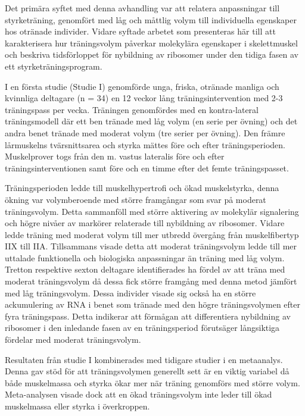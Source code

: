\documentclass[twoside,10pt]{gihclass} %
\begin{document}
Det primära syftet med denna avhandling var att relatera anpassningar till styrketräning, genomfört med låg och måttlig volym till individuella egenskaper hos otränade individer.
Vidare syftade arbetet som presenteras här till att karakterisera hur träningsvolym påverkar molekylära
egenskaper i skelettmuskel och beskriva tidsförloppet för nybildning av ribosomer under den tidiga fasen av ett styrketräningsprogram.

I en första studie (Studie I) genomförde unga, friska, otränade manliga och kvinnliga deltagare (n = 34) en 12 veckor lång träningsintervention med 2-3 träningspass per vecka. Träningen genomfördes med en kontra-lateral träningsmodell där ett ben tränade med låg volym (en serie per övning) och det andra benet tränade med moderat volym (tre serier per övning).
Den främre lårmuskelns tvärsnittsarea och styrka mättes före och efter träningsperioden.
Muskelprover togs från den m. vastus lateralis före och efter träningsinterventionen samt före och en timme efter det femte träningspasset.

Träningsperioden ledde till muskelhypertrofi och ökad muskelstyrka, denna ökning var volymberoende med större framgångar som svar på moderat träningsvolym. Detta sammanföll med större aktivering av molekylär signalering och högre nivåer av markörer relaterade till nybildning av ribosomer. Vidare ledde träning med moderat volym till mer utbredd övergång från muskelfibertyp IIX till IIA. Tillsammans visade detta att moderat träningsvolym ledde till mer uttalade funktionella och biologiska anpassningar än träning med låg volym.
Tretton respektive sexton deltagare identifierades ha fördel av att träna med moderat träningsvolym då dessa fick större framgång med denna metod jämfört med låg träningsvolym. Dessa individer visade sig också ha en större ackumulering av RNA i benet som tränade med den högre träningsvolymen efter fyra träningspass. Detta indikerar att förmågan att differentiera nybildning av ribosomer i den inledande fasen av en träningsperiod förutsäger långsiktiga fördelar med moderat träningsvolym.

Resultaten från studie I kombinerades med tidigare studier i en metaanalys. Denna gav stöd för att träningsvolymen generellt sett är en viktig variabel då både muskelmassa och styrka ökar mer när träning genomförs med större volym. Meta-analysen visade dock att en ökad träningsvolym inte leder till ökad muskelmassa eller styrka i överkroppen.
\end{document}
